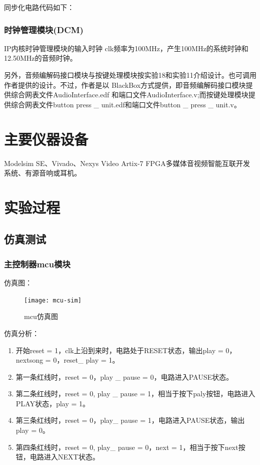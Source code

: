 \documentclass{../source/Experiment}
\begin{document}
                同步化电路代码如下：
                
            
            \subsubsection{时钟管理模块(DCM)}
        
                IP内核时钟管理模块的输入时钟 clk频率为100MHz，产生100MHz的系统时钟和12.50MHz的音频时钟。
                
                另外，音频编解码接口模块与按键处理模块按实验18和实验11介绍设计。也可调用作者提供的设计。不过，作者是以 BlackBox方式提供，即音频编解码接口模块提供综合网表文件AudioInterface.edf 和端口文件AudioInterface.v;而按键处理模块提供综合网表文件button press \_ unit.edf和端口文件button \_ press \_ unit.v。

    \section{主要仪器设备}
    Modelsim SE、Vivado、Nexys Video Artix-7 FPGA多媒体音视频智能互联开发系统、有源音响或耳机。
    \section{实验过程}
        \subsection{仿真测试}
            \subsubsection{主控制器mcu模块}
            仿真图：
                \begin{figure}[H]
                    \centering
                    \texttt{[image: mcu-sim]}
                    \caption{mcu仿真图}
                \end{figure}
            仿真分析：

            \begin{enumerate}
                \item 开始reset = 1，clk上沿到来时，电路处于RESET状态，输出play = 0，nextsong = 0，reset\_ play = 1。 
                \item 第一条红线时，reset = 0，play \_ pause = 0，电路进入PAUSE状态。
                \item 第二条红线时，reset = 0, play \_ pause = 1，相当于按下paly按钮，电路进入PLAY状态，play = 1。 
                \item 第三条红线时，reset = 0，play\_ pause = 1，电路进入PAUSE状态，输出play = 0。 
                \item 第四条红线时，reset = 0, play\_ pause = 0，next = 1，相当于按下next按钮，电路进入NEXT状态。
            \end{enumerate}
\end{document}
